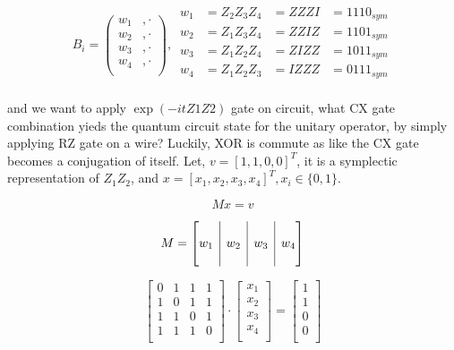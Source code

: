 \documentclass[a4paper,12pt]{article}
\newcommand{\rvline}{\hspace*{-\arraycolsep}\vline\hspace*{-\arraycolsep}}
\begin{document}
\begin{equation}
    B_i = \begin{pmatrix}
        w_1 &, \cdot \\
        w_2 &, \cdot \\
        w_3 &, \cdot \\
        w_4 &, \cdot \\
    \end{pmatrix},
    \,
    \begin{matrix}
        w_1 &= Z_2Z_3Z_4 &= ZZZI &= 1110_{sym}\\
        w_2 &= Z_1Z_3Z_4 &= ZZIZ &= 1101_{sym}\\
        w_3 &= Z_1Z_2Z_4 &= ZIZZ &= 1011_{sym}\\
        w_4 &= Z_1Z_2Z_3 &= IZZZ &= 0111_{sym}\\
    \end{matrix}
\end{equation}

and we want to apply $\exp(-i t Z1Z2)$ gate on circuit, what CX gate combination yieds
the quantum circuit state for the unitary operator, by simply applying RZ gate on a wire?
Luckily, XOR is commute as like the CX gate becomes a conjugation of itself.
Let, $v =[1, 1, 0, 0]^T$, it is a symplectic representation of $Z_1Z_2$,
and $x = [x_1, x_2, x_3, x_4]^T, x_i \in \{0, 1\}$. 

\begin{equation}
    M x = v
\end{equation}

\begin{equation}
    M = \begin{bmatrix}
            & \rvline &     & \rvline &      & \rvline &  \\
        w_1 & \rvline &  w_2& \rvline &  w_3 & \rvline &  w_4\\
            & \rvline &     & \rvline &      & \rvline &  \\
    \end{bmatrix}
\end{equation}

\begin{equation} 
    \begin{bmatrix}
        0 & 1 & 1 & 1 \\
        1 & 0 & 1 & 1 \\
        1 & 1 & 0 & 1 \\
        1 & 1 & 1 & 0 \\
\end{bmatrix} \cdot \begin{bmatrix}
        x_1 \\
        x_2 \\
        x_3 \\
        x_4 \\
    \end{bmatrix} 
    = 
    \begin{bmatrix}
        1 \\
        1 \\
        0 \\
        0 \\
    \end{bmatrix}
\end{equation}
\end{document}
